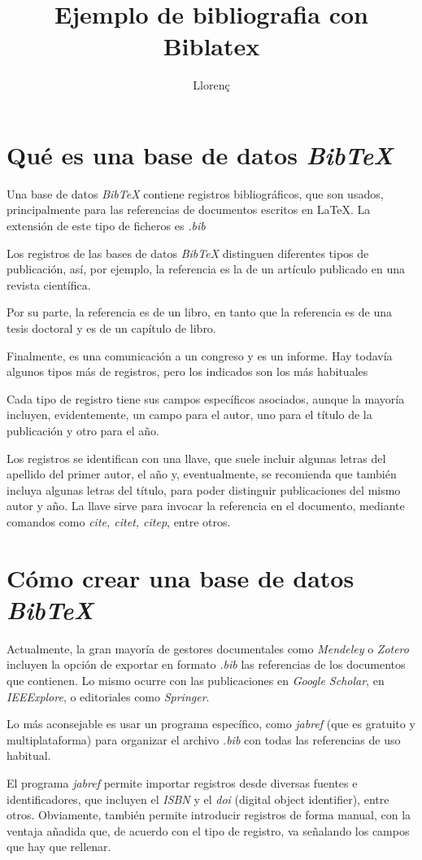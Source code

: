 \documentclass[a4paper, 12pt]{article}
\title{Ejemplo de bibliografia con Biblatex}
\author{Llorenç}
\date {}
\begin{document}
\maketitle
\tableofcontents

\section{Qué es una base de datos {\em Bib\TeX}}

Una base de datos {\em Bib\TeX} contiene registros bibliográficos, que son usados, principalmente para las referencias de documentos escritos en \LaTeX{}. La extensión de este tipo de ficheros es {\em .bib}

Los registros de las bases de datos {\em Bib\TeX} distinguen diferentes tipos de publicación, así, por ejemplo, la referencia \cite{Valverde2008} es la de un artículo publicado en una revista científica.

Por su parte, la referencia \cite{Valverde2015} es de un libro, en tanto que la referencia \cite{MorenoNavarro2016} es de una tesis doctoral y \cite{BouchonMeunier1997} es de un capítulo de libro.

Finalmente, \cite{Almirall2010} es una comunicación a un congreso y \cite{Valverde1984} es un informe. Hay todavía algunos tipos más de registros, pero los indicados son los más habituales

Cada tipo de registro tiene sus campos específicos asociados, aunque la mayoría incluyen, evidentemente, un campo para el autor, uno para el título de la publicación y otro para el año.

Los registros se identifican con una llave, que suele incluir algunas letras del apellido del primer autor, el año y, eventualmente, se recomienda que también incluya algunas letras del título, para poder distinguir publicaciones del mismo autor y año. La llave sirve para invocar la referencia en el documento, mediante comandos como {\em cite, citet, citep}, entre otros.

\section{Cómo crear una base de datos {\em Bib\TeX}}

Actualmente, la gran mayoría de gestores documentales como {\em Mendeley} o {\em Zotero} incluyen la opción de exportar en formato {\em .bib} las referencias de los documentos que contienen. Lo mismo ocurre con las publicaciones en {\em Google Scholar}, en {\em IEEExplore}, o editoriales como {\em Springer}. 

Lo más aconsejable es usar un programa específico, como {\em jabref} (que es gratuito y multiplataforma) para organizar el archivo {\em .bib} con todas las referencias de uso habitual.

El programa {\em jabref} permite importar registros desde diversas fuentes e identificadores, que incluyen el {\em ISBN} y el {\em doi} (digital object identifier), entre otros. Obviamente, también permite introducir registros de forma manual, con la ventaja añadida que, de acuerdo con el tipo de registro, va señalando los campos que hay que rellenar.

\printbibliography[heading=bibintoc,title={Referencias}]
\end{document}

